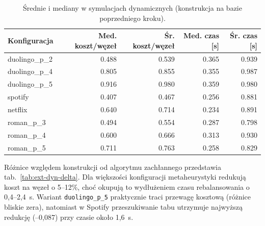 \begin{table}[H]
  \centering
  \caption{Średnie i mediany w symulacjach dynamicznych (konstrukcja na bazie poprzedniego kroku).}
  \label{tab:ext-dyn-overall}
  \begin{tabular}{lrrrr}
    \toprule
    \textbf{Konfiguracja} & \textbf{Med. koszt/węzeł} & \textbf{Śr. koszt/węzeł} & \textbf{Med. czas [s]} & \textbf{Śr. czas [s]} \\
    \midrule
    duolingo\_p\_2        & 0.488                     & 0.539                    & 0.365                  & 0.939                 \\
    duolingo\_p\_4        & 0.805                     & 0.855                    & 0.355                  & 0.987                 \\
    duolingo\_p\_5        & 0.916                     & 0.980                    & 0.359                  & 0.980                 \\
    spotify               & 0.407                     & 0.467                    & 0.256                  & 0.881                 \\
    netflix               & 0.640                     & 0.714                    & 0.234                  & 0.891                 \\
    roman\_p\_3           & 0.494                     & 0.554                    & 0.287                  & 0.798                 \\
    roman\_p\_4           & 0.600                     & 0.666                    & 0.313                  & 0.930                 \\
    roman\_p\_5           & 0.711                     & 0.763                    & 0.258                  & 0.829                 \\
  \end{tabular}
\end{table}

Różnice względem konstrukcji od algorytmu zachłannego przedstawia tab.~\ref{tab:ext-dyn-delta}. Dla większości konfiguracji metaheurystyki redukują koszt na węzeł o 5--12\%, choć okupują to wydłużeniem czasu rebalansowania o 0,4--2,4~s. Wariant \texttt{duolingo\_p\_5} praktycznie traci przewagę kosztową (różnice bliskie zera), natomiast w Spotify przeszukiwanie tabu utrzymuje najwyższą redukcję (--0,087) przy czasie około 1,6~s.

